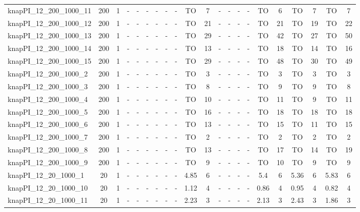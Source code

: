 \begin{sidewaystable}[!ht]
{\begin{tabular}{lcccccccccccccccccccc}
knapPI\_12\_200\_1000\_11 & 200 & 1 &  - &  - &  - &  - &  - &  - & TO & 7 &  - &  - &  - &  - & TO & 6 & TO & 7 & TO & 7 \\
knapPI\_12\_200\_1000\_12 & 200 & 1 &  - &  - &  - &  - &  - &  - & TO & 21 &  - &  - &  - &  - & TO & 21 & TO & 19 & TO & 22 \\
knapPI\_12\_200\_1000\_13 & 200 & 1 &  - &  - &  - &  - &  - &  - & TO & 29 &  - &  - &  - &  - & TO & 42 & TO & 27 & TO & 50 \\
knapPI\_12\_200\_1000\_14 & 200 & 1 &  - &  - &  - &  - &  - &  - & TO & 13 &  - &  - &  - &  - & TO & 18 & TO & 14 & TO & 16 \\
knapPI\_12\_200\_1000\_15 & 200 & 1 &  - &  - &  - &  - &  - &  - & TO & 29 &  - &  - &  - &  - & TO & 48 & TO & 30 & TO & 49 \\
knapPI\_12\_200\_1000\_2 & 200 & 1 &  - &  - &  - &  - &  - &  - & TO & 3 &  - &  - &  - &  - & TO & 3 & TO & 3 & TO & 3 \\
knapPI\_12\_200\_1000\_3 & 200 & 1 &  - &  - &  - &  - &  - &  - & TO & 8 &  - &  - &  - &  - & TO & 9 & TO & 9 & TO & 8 \\
knapPI\_12\_200\_1000\_4 & 200 & 1 &  - &  - &  - &  - &  - &  - & TO & 10 &  - &  - &  - &  - & TO & 11 & TO & 9 & TO & 11 \\
knapPI\_12\_200\_1000\_5 & 200 & 1 &  - &  - &  - &  - &  - &  - & TO & 16 &  - &  - &  - &  - & TO & 18 & TO & 18 & TO & 18 \\
knapPI\_12\_200\_1000\_6 & 200 & 1 &  - &  - &  - &  - &  - &  - & TO & 13 &  - &  - &  - &  - & TO & 15 & TO & 11 & TO & 15 \\
knapPI\_12\_200\_1000\_7 & 200 & 1 &  - &  - &  - &  - &  - &  - & TO & 2 &  - &  - &  - &  - & TO & 2 & TO & 2 & TO & 2 \\
knapPI\_12\_200\_1000\_8 & 200 & 1 &  - &  - &  - &  - &  - &  - & TO & 13 &  - &  - &  - &  - & TO & 17 & TO & 14 & TO & 19 \\
knapPI\_12\_200\_1000\_9 & 200 & 1 &  - &  - &  - &  - &  - &  - & TO & 9 &  - &  - &  - &  - & TO & 10 & TO & 9 & TO & 9 \\
knapPI\_12\_20\_1000\_1 & 20 & 1 &  - &  - &  - &  - &  - &  - & 4.85 & 6 &  - &  - &  - &  - & 5.4 & 6 & 5.36 & 6 & 5.83 & 6 \\
knapPI\_12\_20\_1000\_10 & 20 & 1 &  - &  - &  - &  - &  - &  - & 1.12 & 4 &  - &  - &  - &  - & 0.86 & 4 & 0.95 & 4 & 0.82 & 4 \\
knapPI\_12\_20\_1000\_11 & 20 & 1 &  - &  - &  - &  - &  - &  - & 2.23 & 3 &  - &  - &  - &  - & 2.13 & 3 & 2.43 & 3 & 1.86 & 3 \\

\end{tabular}}
\end{sidewaystable}
